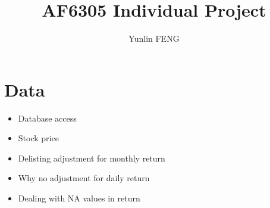 \documentclass{article}
\author{Yunlin FENG}
\title{AF6305 Individual Project}
\begin{document}
\maketitle

\section{Data}

\begin{itemize}
  \item Database access
  \item Stock price
  \item Delisting adjustment for monthly return
  \item Why no adjustment for daily return
  \item Dealing with NA values in return
\end{itemize}

\pagebreak




\end{document}

